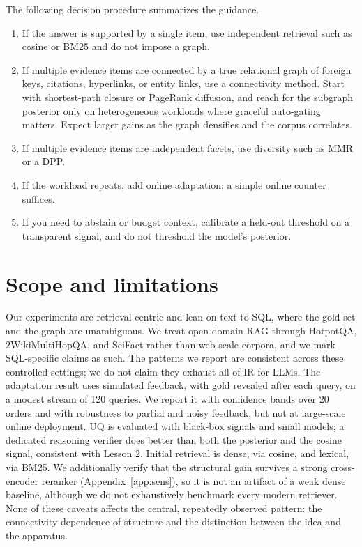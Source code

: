 \documentclass[11pt]{article}
\begin{document}
The following decision procedure summarizes the guidance.
\begin{enumerate}[leftmargin=1.6em,itemsep=1pt]
\item If the answer is supported by a single item, use independent retrieval such as cosine or BM25 and
do not impose a graph.
\item If multiple evidence items are connected by a true relational graph of foreign keys, citations,
hyperlinks, or entity links, use a connectivity method. Start with shortest-path closure or PageRank
diffusion, and reach for the subgraph posterior only on heterogeneous workloads where graceful
auto-gating matters. Expect larger gains as the graph densifies and the corpus correlates.
\item If multiple evidence items are independent facets, use diversity such as MMR or a DPP.
\item If the workload repeats, add online adaptation; a simple online counter suffices.
\item If you need to abstain or budget context, calibrate a held-out threshold on a transparent signal,
and do not threshold the model's posterior.
\end{enumerate}

\section{Scope and limitations}\label{sec:limits}

Our experiments are retrieval-centric and lean on text-to-SQL, where the gold set and the graph are
unambiguous. We treat open-domain RAG through HotpotQA, 2WikiMultiHopQA, and SciFact rather than
web-scale corpora, and we mark SQL-specific claims as such. The patterns we report are consistent across
these controlled settings; we do not claim they exhaust all of IR for LLMs. The adaptation result uses
simulated feedback, with gold revealed after each query, on a modest stream of 120 queries. We report it
with confidence bands over 20 orders and with robustness to partial and noisy feedback, but not at
large-scale online deployment. UQ is evaluated with black-box signals and small models; a dedicated
reasoning verifier does better than both the posterior and the cosine signal, consistent with Lesson 2.
Initial retrieval is dense, via cosine, and lexical, via BM25. We additionally verify that the
structural gain survives a strong cross-encoder reranker (Appendix~\ref{app:sens}), so it is not an
artifact of a weak dense baseline, although we do not exhaustively benchmark every modern retriever.
None of these caveats affects the central, repeatedly observed pattern: the connectivity dependence of
structure and the distinction between the idea and the apparatus.
\end{document}
